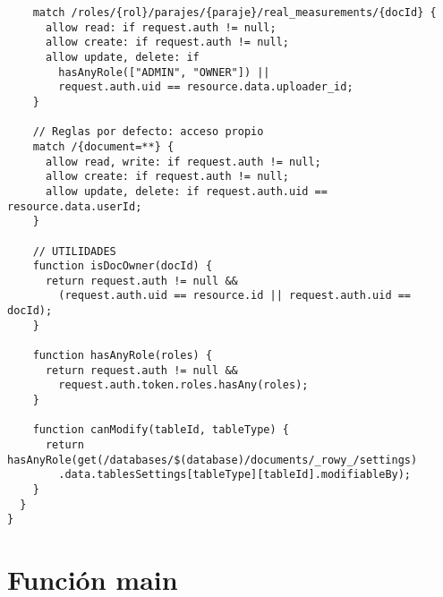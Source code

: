 \begin{verbatim}
    match /roles/{rol}/parajes/{paraje}/real_measurements/{docId} {
      allow read: if request.auth != null;
      allow create: if request.auth != null;
      allow update, delete: if 
        hasAnyRole(["ADMIN", "OWNER"]) || 
        request.auth.uid == resource.data.uploader_id;
    }

    // Reglas por defecto: acceso propio
    match /{document=**} {
      allow read, write: if request.auth != null;
      allow create: if request.auth != null;
      allow update, delete: if request.auth.uid == resource.data.userId;
    }

    // UTILIDADES
    function isDocOwner(docId) {
      return request.auth != null &&
        (request.auth.uid == resource.id || request.auth.uid == docId);
    }

    function hasAnyRole(roles) {
      return request.auth != null &&
        request.auth.token.roles.hasAny(roles);
    }

    function canModify(tableId, tableType) {
      return hasAnyRole(get(/databases/$(database)/documents/_rowy_/settings)
        .data.tablesSettings[tableType][tableId].modifiableBy);
    }
  }
}
\end{verbatim}








\newpage
\section{Función main}
\label{anexo:alg3}

